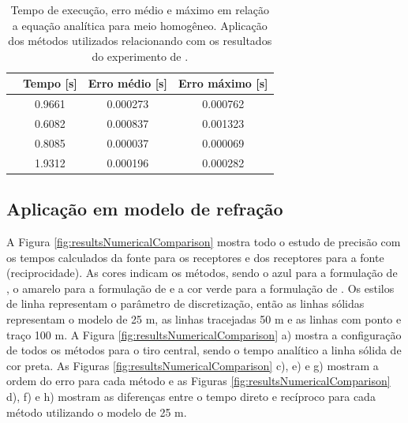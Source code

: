 \begin{table}[H]
	\caption{Tempo de execução, erro médio e máximo em relação a equação analítica para meio homogêneo. Aplicação dos métodos utilizados relacionando com os resultados do experimento de .}
	\begin{tabular}{r|ccc}
		\multicolumn{1}{c|}{} & Tempo {[}s{]} & Erro médio {[}s{]} & Erro máximo {[}s{]} \\ \hline
		\citeonline{podvin1991finite} & 0.9661        & 0.000273           & 0.000762            \\ \hline
		\citeonline{jeong2008fast}    & 0.6082        & 0.000837           & 0.001323            \\ \hline
		\citeonline{noble2014accurate}& 0.8085        & 0.000037           & 0.000069            \\ \hline
		\citeonline{cai2023improved}  & 1.9312        & 0.000196           & 0.000282           
	\end{tabular}
	\label{table_homog}
\end{table}

\subsection*{Aplicação em modelo de refração}

A Figura \ref{fig:resultsNumericalComparison} mostra todo o estudo de precisão com os tempos calculados da fonte para os receptores e dos receptores para a fonte (reciprocidade). As cores indicam os métodos, sendo o azul para a formulação de , o amarelo para a formulação de  e a cor verde para a formulação de . Os estilos de linha representam o parâmetro de discretização, então as linhas sólidas representam o modelo de 25 m, as linhas tracejadas 50 m e as linhas com ponto e traço 100 m. A Figura \ref{fig:resultsNumericalComparison} a) mostra a configuração de todos os métodos para o tiro central, sendo o tempo analítico a linha sólida de cor preta. As Figuras \ref{fig:resultsNumericalComparison} c), e) e g) mostram a ordem do erro para cada método e as Figuras \ref{fig:resultsNumericalComparison} d), f) e h) mostram as diferenças entre o tempo direto e recíproco para cada método utilizando o modelo de 25 m.  

